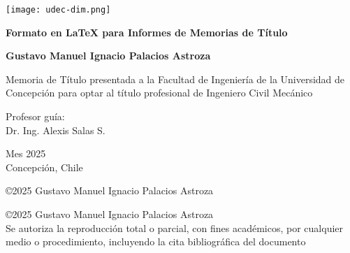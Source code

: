 	
\begin{center}
	
\texttt{[image: udec-dim.png]}
\vspace{5cm}


{\Large
\textbf{Formato en \LaTeX{} para Informes de Memorias de Título \\}
}
\vspace{2.5cm}

{\large
\textbf{Gustavo Manuel Ignacio Palacios Astroza\\}
}
\vspace{2.5cm}

{\normalsize
Memoria de Título presentada a la Facultad de Ingeniería de la Universidad de Concepción para optar al título profesional de Ingeniero Civil Mecánico\\
}
\vspace{2.5cm}


{\normalsize
Profesor guía:\\
Dr. Ing. Alexis Salas S.
}
\vspace{0.5cm}

{\normalsize
Mes 2025\\
Concepción, Chile
}
\vspace{1cm}


{\normalsize
\copyright 2025 Gustavo Manuel Ignacio Palacios Astroza
}


\end{center}

{\footnotesize
\copyright 2025 Gustavo Manuel Ignacio Palacios Astroza\\
Se autoriza la reproducción total o parcial, con fines académicos, por cualquier medio o procedimiento, incluyendo la cita bibliográfica del documento
}
\vspace{0.5cm}

